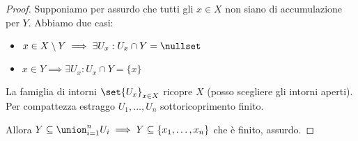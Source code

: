\begin{proof}
 Supponiamo per assurdo che tutti gli $x\in X$ non siano di accumulazione per $Y$.
 Abbiamo due casi:
 \begin{itemize}
  \item $x\in X\setminus Y\implies \exists U_x:U_x\cap Y = \nullset$
  \item $x\in Y\implies \exists U_x:U_x\cap Y = \{ x \}$
 \end{itemize}
 La famiglia di intorni $\set{U_x}_{x\in X}$ ricopre $X$ (posso scegliere gli intorni aperti).
 Per compattezza estraggo $U_1,\dots, U_n$ sottoricoprimento finito.
 
 Allora $Y\subseteq \union_{i=1}^nU_i\implies Y\subseteq \left \{ x_1,\dots,x_n\right \}$ che è finito, assurdo.
\end{proof}
